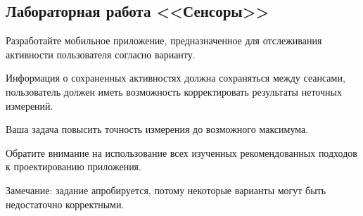 \subsection{Лабораторная работа <<Сенсоры>>}

Разработайте мобильное приложение, предназначенное для отслеживания активности пользователя согласно варианту. 

Информация о сохраненных активностях должна сохраняться между сеансами, пользователь должен иметь возможность корректировать результаты неточных измерений.

Ваша задача повысить точность измерения до возможного максимума.

Обратите внимание на использование всех изученных рекомендованных подходов к проектированию приложения.

Замечание: задание апробируется, потому некоторые варианты могут быть недостаточно корректными.

